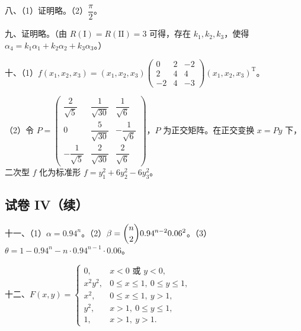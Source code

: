 \documentclass[UTF8,12pt]{ctexart}
\begin{document}
八、（1）证明略。（2）\(\displaystyle \dfrac{\displaystyle \pi}{\displaystyle 2}\)。


九、证明略。（由 \(\displaystyle R(\mathrm I)=R(\mathrm{II})=3\) 可得，存在 \(\displaystyle k_1,\allowbreak k_2,\allowbreak k_3\)，使得 \(\displaystyle \alpha_4=k_1\alpha_1+k_2\alpha_2+k_3\alpha_3\)。）


十、（1）\(\displaystyle f(x_1,\allowbreak x_2,\allowbreak x_3)=(x_1,\allowbreak x_2,\allowbreak x_3)\begin{pmatrix}0&2&-2\\2&4&4\\-2&4&-3\end{pmatrix}(x_1,\allowbreak x_2,\allowbreak x_3)^{\mathrm T}\)。


（2）令 \(\displaystyle P=\begin{pmatrix}\dfrac{\displaystyle 2}{\displaystyle \sqrt5}&\dfrac{\displaystyle 1}{\displaystyle \sqrt{30}}&\dfrac{\displaystyle 1}{\displaystyle \sqrt6}\\0&\dfrac{\displaystyle 5}{\displaystyle \sqrt{30}}&-\dfrac{\displaystyle 1}{\displaystyle \sqrt6}\\-\dfrac{\displaystyle 1}{\displaystyle \sqrt5}&\dfrac{\displaystyle 2}{\displaystyle \sqrt{30}}&\dfrac{\displaystyle 2}{\displaystyle \sqrt6}\end{pmatrix}\)，\(\displaystyle P\) 为正交矩阵。在正交变换 \(\displaystyle x=Py\) 下，二次型 \(\displaystyle f\) 化为标准形 \(\displaystyle f=y_1^2+6y_2^2-6y_3^2\)。


\subsection*{试卷 IV（续）}

十一、（1）\(\displaystyle \alpha=0.94^n\)。（2）\(\displaystyle \beta=\dbinom{\displaystyle n}{\displaystyle 2} 0.94^{n-2}0.06^2\)。（3）\(\displaystyle \theta=1-0.94^n-n\cdot0.94^{n-1}\cdot0.06\)。


十二、\(\displaystyle F(x,\allowbreak y)=\begin{cases}0,\allowbreak &x<0\text{ 或 }y<0,\allowbreak \\x^2y^2,\allowbreak &0\leq x\leq1,\allowbreak \ 0\leq y\leq1,\allowbreak \\x^2,\allowbreak &0\leq x\leq1,\allowbreak \ y>1,\allowbreak \\y^2,\allowbreak &x>1,\allowbreak \ 0\leq y\leq1,\allowbreak \\1,\allowbreak &x>1,\allowbreak \ y>1.\end{cases}\)
\end{document}
